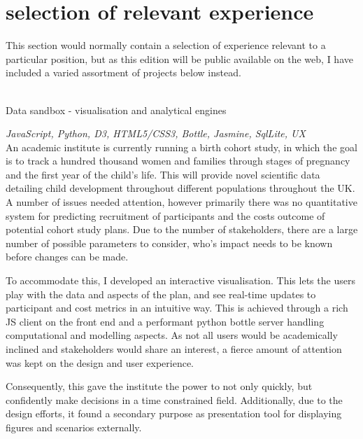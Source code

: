 \documentclass[]{friggeri-cv} %
\begin{document}

\newpage
\section{selection of relevant experience}
This section would normally contain a selection of experience relevant to a particular position, but as this edition will be public available on the web, I have included a varied assortment of projects below instead. \\
\\
\begin{entrylist}
\projectentry
{Data sandbox -  visualisation and analytical engines}
{\emph{JavaScript, Python, D3, HTML5/CSS3, Bottle, Jasmine, SqlLite, UX} \\
An academic institute is currently running a birth cohort study, in which the goal is to track a hundred thousand women and families through stages of pregnancy and the first year of the child’s life. This will provide novel scientific data detailing  child development throughout different populations throughout the UK.
A number of issues needed attention, however primarily there was no quantitative system for predicting recruitment of participants and the costs outcome of potential cohort study plans. Due to the number of stakeholders, there are a large number of possible parameters to consider, who's impact needs to be known before changes can be made.

To accommodate this, I developed an interactive visualisation. This lets the users play with the data and aspects of the plan, and see real-time updates to participant and cost metrics in an intuitive way. This is achieved through a rich JS client on the front end and a performant python bottle server handling computational and modelling aspects. As not all users would be academically inclined and stakeholders would share an interest, a fierce amount of attention was kept on the design and user experience.

Consequently, this gave the institute the power to not only quickly, but confidently make decisions in a time constrained field. Additionally, due to the design efforts, it found a secondary purpose as presentation tool for displaying figures and scenarios externally.}
\end{entrylist}
\end{document}
